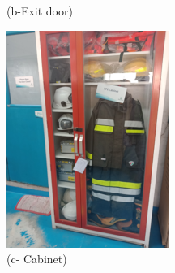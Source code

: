 \begin{figure}[!h]
\begin{minipage}[b]{0.22\linewidth}
		\caption*{(b-Exit door)}
	\end{minipage}
	\hspace{0.03cm}
	\begin{minipage}[b]{0.22\linewidth}
		\centering
		\includegraphics[width=\textwidth]{figures/ch04_fig_safety05}
		\caption*{(c- Cabinet)}
	\end{minipage}
	\hspace{0.03cm}
	\begin{minipage}[b]{0.22\linewidth}
		\centering

\end{minipage}
\end{figure}
